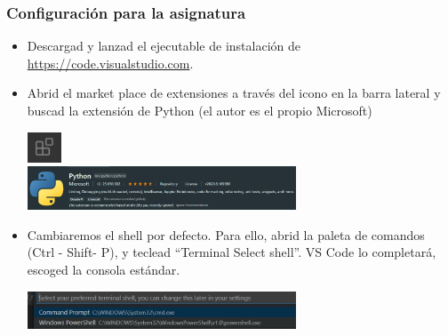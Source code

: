 \documentclass[9pt]{beamer}
\begin{document}
\begin{frame}
    \frametitle{Configuración para la asignatura}
          \begin{itemize}
      \item      Descargad y lanzad el ejecutable de instalación de
        \href{https://code.visualstudio.com}{https://code.visualstudio.com}.
    \item Abrid el market place de extensiones a través del icono en
      la barra lateral y buscad la extensión de Python (el autor es el
      propio Microsoft)
                                   \begin{center}
        \includegraphics[width=1cm]{extensions_icon.png}\\
        \medskip
        \includegraphics[width=8cm]{python_extension_vscode.png}
                                   \end{center}
                                 \item Cambiaremos el shell por
                                   defecto. Para ello, abrid la paleta
                                   de comandos  (Ctrl - Shift- P),
                                   y teclead  ``Terminal Select
                                   shell''. VS Code lo completará,
                                   escoged la consola estándar.
                                   \begin{center}
                                     \includegraphics[width=8cm]{select_command_prompt}
                                   \end{center}
                                 \end{itemize}
                               \end{frame}
\end{document}
